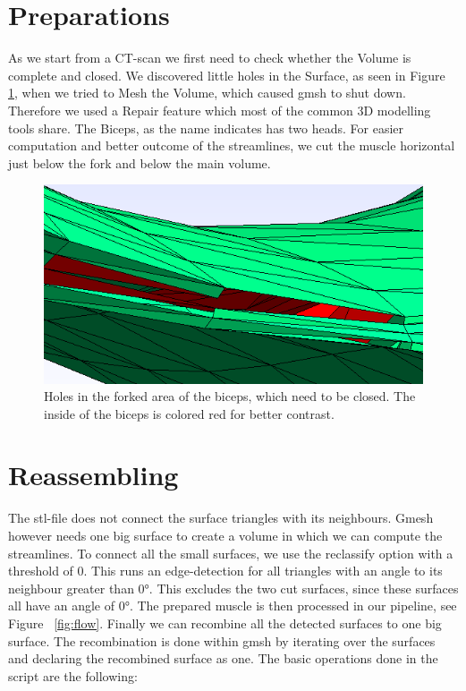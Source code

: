 \documentclass[preprint,journal]{vgtc}       %
\begin{document}
\section{Preparations}
As we start from a CT-scan we first need to check whether the Volume is complete and closed. We discovered little holes in the Surface, as seen  in Figure \ref{fig:holes}, when we tried to Mesh the Volume, which caused gmsh to shut down. Therefore we used a Repair feature which most of the common 3D modelling tools share. 
The Biceps, as the name indicates has two heads. For easier computation and better outcome of the streamlines, we cut  the muscle horizontal just below the fork and below the main volume. 

\begin{figure}
	\begin{center}
		\includegraphics[width = .6\linewidth]{holes.png}
	\end{center}
	\caption{Holes in the forked area of the biceps, which need to be closed. The inside of the biceps is colored red for better contrast.}
	\label{fig:holes}
\end{figure}

\section{Reassembling}
The stl-file does not connect the surface triangles with its neighbours. Gmesh however needs one big surface to create a volume in which we can compute the streamlines. To connect all the small surfaces, we use the reclassify option with a threshold of 0. This runs an edge-detection for all triangles with an angle to its neighbour greater than \ang{0}. This excludes the two cut surfaces, since these surfaces all have an angle of \ang{0}. The prepared muscle is then processed in our pipeline, see Figure ~\ref{fig:flow}. Finally we can recombine all the detected surfaces to one big surface. The recombination is done within gmsh by iterating over the surfaces and declaring the recombined surface as one. The basic operations done in the script are the following:
\end{document}
